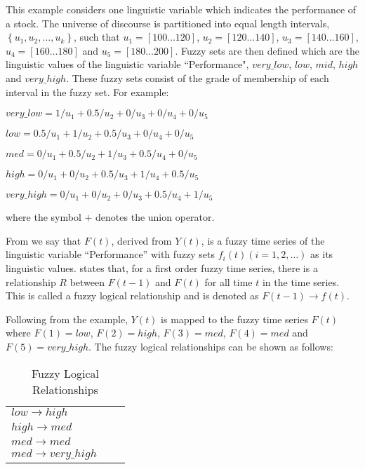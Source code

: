 \documentclass[12pt]{article}
\theoremstyle{definition}
\begin{document}
This example considers one linguistic variable which indicates the performance of a stock. The universe of discourse is partitioned into equal length intervals, $\left\{u_1, u_2,\ldots,u_k\right\}$, such that $u_1 = [100 \ldots 120]$, $u_2 = [120 \ldots 140]$, $u_3 = [140 \ldots 160]$, $u_4 = [160 \ldots 180]$ and $u_5 = [180 \ldots 200]$. Fuzzy sets are then defined which are the linguistic values of the linguistic variable ``Performance", $very\_low$, $low$, $mid$, $high$ and $very\_high$. These fuzzy sets consist of the grade of membership of each interval in the fuzzy set. For example:
\begin{description}
\label{fuzzy_sets}
\item[] $very\_low = 1/u_1 + 0.5/u_2 + 0/u_3 + 0/u_4 + 0/u_5$
\item[] $low = 0.5/u_1 + 1/u_2 + 0.5/u_3 + 0/u_4 + 0/u_5$
\item[] $med = 0/u_1 + 0.5/u_2 + 1/u_3 + 0.5/u_4 + 0/u_5$
\item[] $high = 0/u_1 + 0/u_2 + 0.5/u_3 + 1/u_4 + 0.5/u_5$
\item[] $very\_high = 0/u_1 + 0/u_2 + 0/u_3 + 0.5/u_4 + 1/u_5$
\end{description}
where the symbol $+$ denotes the union operator.

From  we say that $F(t)$, derived from $Y(t)$, is a fuzzy time series of the linguistic variable ``Performance'' with fuzzy sets $f_i(t) (i=1,2,\ldots)$ as its linguistic values.  states that, for a first order fuzzy time series, there is a relationship $R$ between $F(t-1)$ and $F(t)$ for all time $t$ in the time series. This is called a fuzzy logical relationship and is denoted as $F(t-1) \rightarrow f(t)$.

Following from the example, $Y(t)$ is mapped to the fuzzy time series $F(t)$ where $F(1)=low$, $F(2)=high$, $F(3)=med$, $F(4)=med$ and $F(5)=very\_high$. The fuzzy logical relationships can be shown as follows: 

\begin{table}[h]
	\center
	\begin{tabular}{ l l l }
  	$low \rightarrow high$  \\
  	$high \rightarrow med$ \\
  	$med \rightarrow med$ \\
  	$med \rightarrow very\_high$ \\
	\end{tabular}
	\caption{Fuzzy Logical Relationships}
\end{table}
\end{document}
